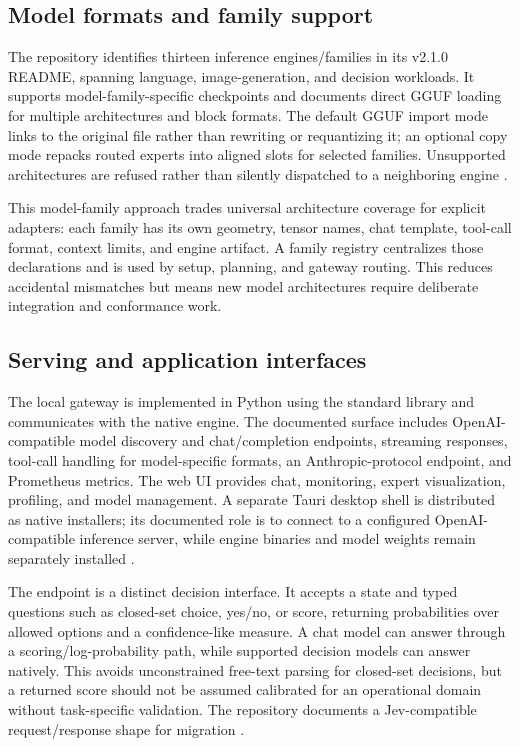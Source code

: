 \documentclass[10pt,twocolumn]{article}
\newcommand{\code}[1]{\texttt{\small\detokenize{#1}}}
\begin{document}
\subsection{Model formats and family support}
The repository identifies thirteen inference engines/families in its v2.1.0 README, spanning language, image-generation, and decision workloads. It supports model-family-specific checkpoints and documents direct GGUF loading for multiple architectures and block formats. The default GGUF import mode links to the original file rather than rewriting or requantizing it; an optional copy mode repacks routed experts into aligned slots for selected families. Unsupported architectures are refused rather than silently dispatched to a neighboring engine \cite{qoralisreadme,qoralisgguf,qoralisregistry}.

This model-family approach trades universal architecture coverage for explicit adapters: each family has its own geometry, tensor names, chat template, tool-call format, context limits, and engine artifact. A family registry centralizes those declarations and is used by setup, planning, and gateway routing. This reduces accidental mismatches but means new model architectures require deliberate integration and conformance work.

\subsection{Serving and application interfaces}
The local gateway is implemented in Python using the standard library and communicates with the native engine. The documented surface includes OpenAI-compatible model discovery and chat/completion endpoints, streaming responses, tool-call handling for model-specific formats, an Anthropic-protocol endpoint, and Prometheus metrics. The web UI provides chat, monitoring, expert visualization, profiling, and model management. A separate Tauri desktop shell is distributed as native installers; its documented role is to connect to a configured OpenAI-compatible inference server, while engine binaries and model weights remain separately installed \cite{qoralisapi,qoralisreadme,qoralispyproject}.

The \code{/v1/systemone} endpoint is a distinct decision interface. It accepts a state and typed questions such as closed-set choice, yes/no, or score, returning probabilities over allowed options and a confidence-like measure. A chat model can answer through a scoring/log-probability path, while supported decision models can answer natively. This avoids unconstrained free-text parsing for closed-set decisions, but a returned score should not be assumed calibrated for an operational domain without task-specific validation. The repository documents a Jev-compatible request/response shape for migration \cite{qoralissystemone}.
\end{document}

